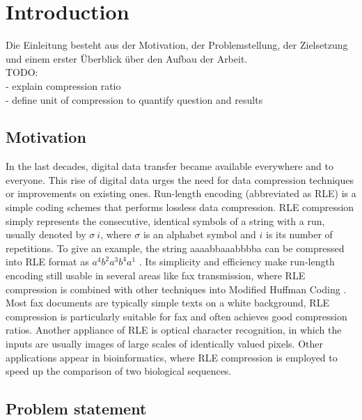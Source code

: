 
\chapter{Introduction}
\label{ch:Introduction}
Die Einleitung besteht aus der Motivation, der Problemstellung, der Zielsetzung und einem erster Überblick über den Aufbau der Arbeit. \\
TODO: \\
- explain compression ratio \\
- define unit of compression to quantify question and results \\

\section{Motivation}
\label{ch:Introduction:sec:Motivation}

In the last decades, digital data transfer became available everywhere and to everyone. This rise of digital data urges the need for data compression techniques or improvements on existing ones. Run-length encoding \cite{rle-patent} (abbreviated as RLE) is a simple coding schemes that performs lossless data compression. RLE compression simply represents the consecutive, identical symbols of
a string with a run, usually denoted by $\sigma \ i$, where $\sigma$ is an alphabet symbol and $i$ is its number of repetitions. To give an example, the string aaaabbaaabbbba can be compressed into RLE format as  $ a^{4}b^{2}a^{3}b^{4}a^{1}$ . Its simplicity and efficiency make run-length encoding still usable in several areas like fax transmission, where RLE compression is combined with other techniques into Modified Huffman Coding \cite{fax-rle}. Most fax documents are typically simple texts on a white background, RLE compression is particularly suitable for fax and often achieves good compression ratios. Another appliance of RLE is optical character recognition, in which the inputs are usually images of large scales of identically valued pixels. Other applications appear in bioinformatics, where RLE compression is employed to speed up the comparison of two biological sequences.

\section{Problem statement}
\label{ch:Introduction:sec:Problem statement}

